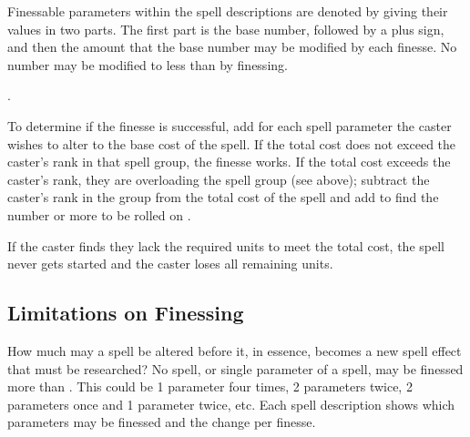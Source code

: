 \begin{multicols*}{2}
Finessable parameters within the spell descriptions are denoted by giving their values in two parts. The first part is the base number, followed by a plus sign, and then the
amount that the base number may be modified by each finesse. No number may be modified to less than  by finessing.

. 

To determine if the finesse is successful, add  for each spell parameter the caster wishes to alter to the base cost of the spell. If the total cost does not exceed the caster's rank in that spell group, the finesse works. If the total cost exceeds the caster's rank, they are overloading the spell group (see above); subtract the caster's rank in the group from the total cost of the spell and add  to find the number or more to be rolled on .


If the caster finds they lack the required units to meet the total cost, the spell never gets started and the caster loses all remaining units. 

\subsection{Limitations on Finessing}
How much may a spell be altered before it, in essence, becomes a new spell effect that must be researched? No spell, or single parameter of a spell, may be finessed more than . This could be 1 parameter four times, 2 parameters twice, 2 parameters once and 1 parameter twice, etc. Each spell description shows which parameters may be finessed and the change per finesse.


\end{multicols*}
